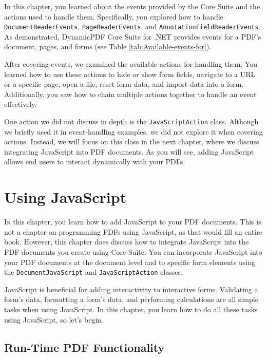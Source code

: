 \documentclass[american]{tufte-book}
\numberwithin{equation}{section}
\numberwithin{figure}{section}
\def\color#1{}%
\begin{document}
{{In this chapter, you learned about the events provided by the Core Suite and the actions used to handle them. Specifically, you explored how to handle \texttt{DocumentReaderEvents}, \texttt{PageReaderEvents}, and \texttt{AnnotationFieldReaderEvents}. As demonstrated, DynamicPDF Core Suite for .NET provides events for a PDF’s document, pages, and forms (see Table \ref{tab:Available-events-for}).

After covering events, we examined the available actions for handling them. You learned how to use these actions to hide or show form fields, navigate to a URL or a specific page, open a file, reset form data, and import data into a form. Additionally, you saw how to chain multiple actions together to handle an event effectively.

One action we did not discuss in depth is the \texttt{JavaScriptAction} class. Although we briefly used it in event-handling examples, we did not explore it when covering actions. Instead, we will focus on this class in the next chapter, where we discuss integrating JavaScript into PDF documents. As you will see, adding JavaScript allows end users to interact dynamically with your PDFs.

\color{white}
\chapter{Using JavaScript}\label{chap:Using-JavaScript}
\color{black}
\BgThispage
\vspace{8.00em}
\lettrine[lines=2,lhang=0.1]{I}{n} this chapter, you learn how to add JavaScript to your PDF documents.
This is not a chapter on programming PDFs using JavaScript, as that
would fill an entire book. However, this chapter does discuss how
to integrate JavaScript into the PDF documents you create using Core
Suite. You can incorporate JavaScript into your PDF documents at the
document level and to specific form elements using the \texttt{DocumentJavaScript}
and \texttt{JavaScriptAction} classes.

JavaScript is beneficial for adding interactivity to interactive
forms. Validating a form's data, formatting a form's data, and performing
calculations are all simple tasks when using JavaScript. In this chapter,
you learn how to do all these tasks using JavaScript, so let's
begin.

\section{Run-Time PDF Functionality}

}}
\end{document}
